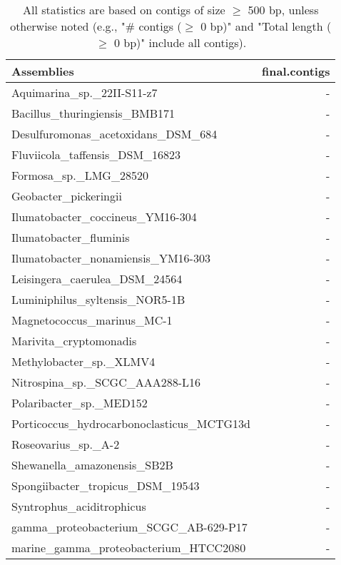 \documentclass[12pt,a4paper]{article}
\begin{document}
\begin{table}[ht]
\begin{center}
\caption{All statistics are based on contigs of size $\geq$ 500 bp, unless otherwise noted (e.g., "\# contigs ($\geq$ 0 bp)" and "Total length ($\geq$ 0 bp)" include all contigs).}
\begin{tabular}{|l*{1}{|r}|}
\hline
Assemblies & final.contigs \\ \hline
Aquimarina\_sp.\_22II-S11-z7 & - \\ \hline
Bacillus\_thuringiensis\_BMB171 & - \\ \hline
Desulfuromonas\_acetoxidans\_DSM\_684 & - \\ \hline
Fluviicola\_taffensis\_DSM\_16823 & - \\ \hline
Formosa\_sp.\_LMG\_28520 & - \\ \hline
Geobacter\_pickeringii & - \\ \hline
Ilumatobacter\_coccineus\_YM16-304 & - \\ \hline
Ilumatobacter\_fluminis & - \\ \hline
Ilumatobacter\_nonamiensis\_YM16-303 & - \\ \hline
Leisingera\_caerulea\_DSM\_24564 & - \\ \hline
Luminiphilus\_syltensis\_NOR5-1B & - \\ \hline
Magnetococcus\_marinus\_MC-1 & - \\ \hline
Marivita\_cryptomonadis & - \\ \hline
Methylobacter\_sp.\_XLMV4 & - \\ \hline
Nitrospina\_sp.\_SCGC\_AAA288-L16 & - \\ \hline
Polaribacter\_sp.\_MED152 & - \\ \hline
Porticoccus\_hydrocarbonoclasticus\_MCTG13d & - \\ \hline
Roseovarius\_sp.\_A-2 & - \\ \hline
Shewanella\_amazonensis\_SB2B & - \\ \hline
Spongiibacter\_tropicus\_DSM\_19543 & - \\ \hline
Syntrophus\_aciditrophicus & - \\ \hline
gamma\_proteobacterium\_SCGC\_AB-629-P17 & - \\ \hline
marine\_gamma\_proteobacterium\_HTCC2080 & - \\ \hline
\end{tabular}
\end{center}
\end{table}
\end{document}

